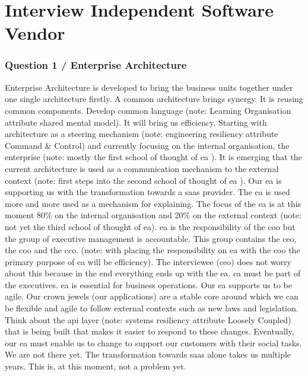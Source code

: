 \section{Interview Independent Software Vendor}
\label{sec:interviewisv}
\subsubsection{Question 1 / Enterprise Architecture}
Enterprise Architecture is developed to bring the business units together under one single architecture firstly. A common architecture brings synergy. It is reusing common components. Develop common language (note: Learning Organisation attribute shared mental model). It will bring us efficiency. Starting with architecture as a steering mechanism (note: engineering \gls{resiliency} attribute Command \& Control) and currently focusing on the internal organisation, the enterprise (note: mostly the first school of thought of \acrshort{ea} \parencite{Lapalme2012}). It is emerging that the current architecture is used as a communication mechanism to the external context (note: first steps into the second school of thought of \acrshort{ea} \parencite{Lapalme2012}). Our \acrshort{ea} is supporting us with the transformation towards a \acrfull{saas} provider. The \acrshort{ea} is used more and more used as a mechanism for explaining. The focus of the \acrshort{ea} is at this moment 80\% on the internal organisation and 20\% on the external context (note: not yet the third school of thought of \acrshort{ea}).
\acrshort{ea} is the responsibility of the \acrfull{coo} but the group of executive management is accountable. This group contains the \acrfull{ceo}, the \acrshort{coo} and the \acrfull{cco}. (note: with placing the responsibility on \acrshort{ea} with the \acrshort{coo} the primary purpose of \acrshort{ea} will be efficiency). The interviewee (\acrshort{ceo}) does not worry about this because in the end everything ends up with the \acrshort{ea}. \acrshort{ea} must be part of the executives. \acrshort{ea} is essential for business operations.
Our \acrshort{ea} supports us to be agile. Our crown jewels (our applications) are a stable core around which we can be flexible and agile to follow external contexts such as new laws and legislation. Think about the \acrfull{api} layer (note: systems \gls{resiliency} attribute Loosely Coupled) that is being built that makes it easier to respond to these changes. Eventually, our \acrshort{ea} must enable us to change to support our customers with their social tasks. We are not there yet. The transformation towards \acrfull{saas} alone takes us multiple years. This is, at this moment, not a problem yet.
